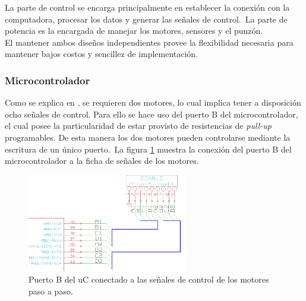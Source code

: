 La parte de control se encarga principalmente en establecer la conexi\'on con
la computadora, procesar los datos y generar las se\~nales de control.\
La parte de potencia es la encargada de manejar los motores, sensores y el
punz\'on.\\

El mantener ambos dise\~nos independientes provee la flexibilidad necesaria
para mantener bajos costos y sencillez de implementaci\'on.


\subsubsection{Microcontrolador}




Como se explica en , se requieren dos motores, lo
cual implica tener a disposici\'on ocho se\~nales de control. Para ello se hace
uso del puerto B del microcontrolador, el cual posee la particularidad de estar
provisto de resistencias de \emph{pull-up} programables. De esta manera los
dos motores pueden controlarse mediante la escritura de un \'unico puerto.\
La figura \ref{fig:uc_portb_motors} muestra la conexi\'on del puerto B del
microcontrolador a la ficha de se\~nales de los motores.


\begin{figure}[htp]
\centering
\includegraphics[width=7cm]{./img/uc_portb_motors.png}
\caption{Puerto B del uC conectado a las se\~nales de control de los motores
paso a paso.}
\label{fig:uc_portb_motors}
\end{figure}
 


